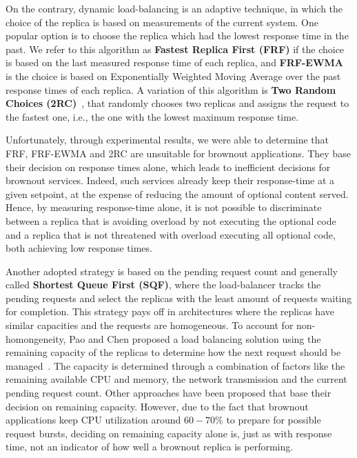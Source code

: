 On the contrary, dynamic load-balancing is an adaptive technique, in
which the choice of the replica is based on measurements of the
current system.  One popular option is to choose the replica which had
the lowest response time in the past.  We refer to this algorithm as
\textbf{Fastest Replica First (FRF)} if the choice is based on the
last measured response time of each replica, and \textbf{FRF-EWMA} is
the choice is based on Exponentially Weighted Moving Average over the
past response times of each replica.  A variation of this algorithm is
\textbf{Two Random Choices (2RC)}~\cite{2RC}, that randomly chooses
two replicas and assigns the request to the fastest one, i.e., the one
with the lowest maximum response time.

Unfortunately, through experimental results, we were able to determine
that FRF, FRF-EWMA and 2RC are unsuitable for brownout
applications. They base their decision on response times alone, which
leads to inefficient decisions for brownout services. Indeed, such
services already keep their response-time at a given setpoint, at the
expense of reducing the amount of optional content served. Hence, by
measuring response-time alone, it is not possible to discriminate
between a replica that is avoiding overload by not executing the
optional code and a replica that is not threatened with overload
executing all optional code, both achieving low response times.

Another adopted strategy is based on the pending request count and
generally called \textbf{Shortest Queue First (SQF)}, where the
load-balancer tracks the pending requests and select the replicas with
the least amount of requests waiting for completion. This strategy
pays off in architectures where the replicas have similar capacities
and the requests are homogeneous. To account for non-homongeneity, Pao
and Chen proposed a load balancing solution using the remaining
capacity of the replicas to determine how the next request should be
managed~\cite{feedbackintensive}. The capacity is determined through a
combination of factors like the remaining available CPU and memory,
the network transmission and the current pending request count.  Other
approaches have been proposed that base their decision on remaining
capacity. However, due to the fact that brownout applications keep CPU
utilization around $60-70\%$ to prepare for possible request bursts,
deciding on remaining capacity alone is, just as with response time,
not an indicator of how well a brownout replica is performing.


